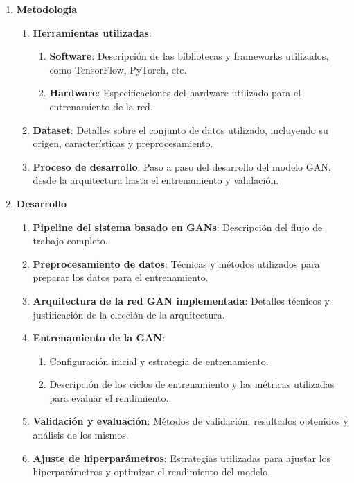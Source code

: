 \begin{enumerate}[label=\textbf{\arabic*.}]
    \item \textbf{Metodología}
    \begin{enumerate}[label=\textbf{\arabic*.}]
        \item \textbf{Herramientas utilizadas}:
        \begin{enumerate}[label=\textbf{\arabic*.}]
            \item \textbf{Software}: Descripción de las bibliotecas y frameworks utilizados, como TensorFlow, PyTorch, etc.
            \item \textbf{Hardware}: Especificaciones del hardware utilizado para el entrenamiento de la red.
        \end{enumerate}
        \item \textbf{Dataset}: Detalles sobre el conjunto de datos utilizado, incluyendo su origen, características y preprocesamiento.
        \item \textbf{Proceso de desarrollo}: Paso a paso del desarrollo del modelo GAN, desde la arquitectura hasta el entrenamiento y validación.
    \end{enumerate}

    \item \textbf{Desarrollo}
    \begin{enumerate}[label=\textbf{\arabic*.}]
        \item \textbf{Pipeline del sistema basado en GANs}: Descripción del flujo de trabajo completo.
        \item \textbf{Preprocesamiento de datos}: Técnicas y métodos utilizados para preparar los datos para el entrenamiento.
        \item \textbf{Arquitectura de la red GAN implementada}: Detalles técnicos y justificación de la elección de la arquitectura.
        \item \textbf{Entrenamiento de la GAN}:
        \begin{enumerate}[label=\textbf{\arabic*.}]
            \item Configuración inicial y estrategia de entrenamiento.
            \item Descripción de los ciclos de entrenamiento y las métricas utilizadas para evaluar el rendimiento.
        \end{enumerate}
        \item \textbf{Validación y evaluación}: Métodos de validación, resultados obtenidos y análisis de los mismos.
        \item \textbf{Ajuste de hiperparámetros}: Estrategias utilizadas para ajustar los hiperparámetros y optimizar el rendimiento del modelo.
    \end{enumerate}


\end{enumerate}
